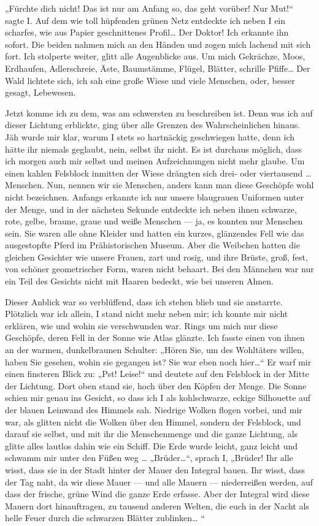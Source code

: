 „Fürchte dich nicht! Das ist nur am Anfang so, das geht vorüber!
Nur Mut!“ sagte I. Auf dem wie toll hüpfenden grünen Netz entdeckte
ich
neben I ein scharfes, wie aus Papier geschnittenes Profil\ldots{} Der
Doktor! Ich erkannte ihn sofort. Die beiden nahmen mich an den
Händen und zogen mich lachend mit sich fort. Ich stolperte weiter,
glitt alle Augenblicke aus. Um mich Gekrächze, Moos, Erdhaufen,
Adlerschreie, Äste, Baumstämme, Flügel, Blätter, schrille Pfiffe\ldots{}
Der Wald lichtete sich, ich sah eine große Wiese und viele
Menschen, oder, besser gesagt, Lebewesen.

Jetzt komme ich zu dem, was am schwersten zu beschreiben ist. Denn
was ich auf dieser Lichtung erblickte, ging über alle Grenzen des
Wahrscheinlichen hinaus. Jäh wurde mir klar, warum I stets so
hartnäckig geschwiegen hatte, denn ich hätte ihr niemals geglaubt,
nein, selbst ihr nicht. Es ist durchaus möglich, dass ich morgen
auch mir selbst und meinen Aufzeichnungen nicht mehr glaube. Um
einen kahlen Felsblock inmitten der Wiese drängten sich drei- oder
viertausend \ldots{} Menschen. Nun, nennen wir sie Menschen, anders kann
man diese Geschöpfe wohl nicht bezeichnen. Anfangs erkannte ich nur
unsere blaugrauen Uniformen unter der Menge, und in der nächsten
Sekunde entdeckte ich neben ihnen schwarze, rote, gelbe, braune,
graue und weiße Menschen — ja, es konnten nur Menschen sein. Sie
waren alle ohne Kleider und hatten ein kurzes, glänzendes Fell wie
das ausgestopfte Pferd im Prähistorischen Museum. Aber die Weibchen
hatten die gleichen Gesichter wie unsere Frauen, zart und rosig,
und ihre Brüste, groß, fest, von schöner geometrischer Form, waren
nicht behaart. Bei den Männchen war nur ein Teil des Gesichts nicht
mit Haaren bedeckt, wie bei unseren Ahnen.

Dieser Anblick war so verblüffend, dass ich stehen blieb und sie
anstarrte. Plötzlich war ich allein, I stand nicht mehr neben mir;
ich
konnte mir nicht erklären, wie und wohin sie verschwunden war.
Rings um mich nur diese Geschöpfe, deren Fell in der Sonne wie
Atlas glänzte. Ich fasste einen von ihnen an der warmen,
dunkelbraunen Schulter: „Hören Sie, um des Wohltäters willen, haben
Sie gesehen, wohin sie gegangen ist? Sie war eben noch hier\ldots{}“ Er
warf mir einen finsteren Blick zu: „Pst! Leise!“ und deutete auf
den Felsblock in der Mitte der Lichtung. Dort oben stand sie, hoch
über den Köpfen der Menge. Die Sonne schien mir genau ins Gesicht,
so dass ich I als kohlschwarze, eckige Silhouette auf der blauen
Leinwand des Himmels sah. Niedrige Wolken flogen vorbei, und mir
war, als glitten nicht die Wolken über den Himmel, sondern der
Felsblock, und darauf sie selbst, und mit ihr die Menschenmenge und
die ganze Lichtung, als glitte alles lautlos dahin wie ein Schiff.
Die Erde wurde leicht, ganz leicht und schwamm mir unter den Füßen
weg \ldots{} „Brüder\ldots{}“, sprach I, „Brüder! Ihr alle wisst, dass sie in
der Stadt hinter der Mauer den Integral bauen. Ihr wisst, dass der
Tag naht, da wir diese Mauer — und alle Mauern — niederreißen
werden, auf dass der frische, grüne Wind die ganze Erde erfasse.
Aber der Integral wird diese Mauern dort hinauftragen, zu tausend
anderen Welten, die euch in der Nacht als helle Feuer durch die
schwarzen Blätter zublinken\ldots{} “

